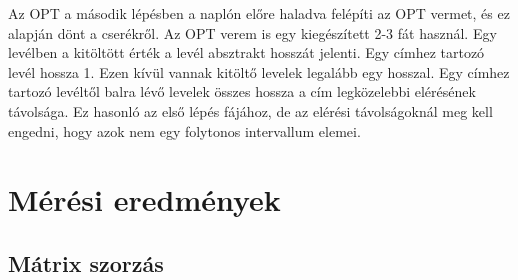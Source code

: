 \documentclass[12pt]{report}
\begin{document}
Az OPT a második lépésben a naplón előre haladva felépíti az OPT vermet,
és ez alapján dönt a cserékről.
Az OPT verem is egy kiegészített 2-3 fát használ.
Egy levélben a kitöltött érték a levél absztrakt hosszát jelenti.
Egy címhez tartozó levél hossza 1.
Ezen kívül vannak kitöltő levelek legalább egy hosszal.
Egy címhez tartozó levéltől balra lévő levelek összes hossza
a cím legközelebbi elérésének távolsága.
Ez hasonló az első lépés fájához, de az elérési távolságoknál meg kell engedni,
hogy azok nem egy folytonos intervallum elemei.

\chapter{Mérési eredmények}

\section{Mátrix szorzás}
\end{document}
